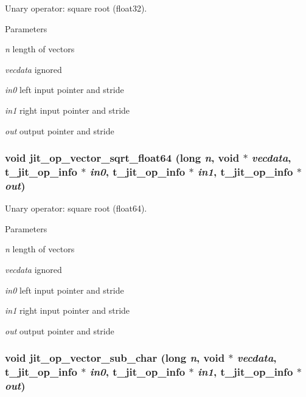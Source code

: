 Unary operator: square root (float32). 
\begin{DoxyParams}{Parameters}
\item[{\em n}]length of vectors \item[{\em vecdata}]ignored \item[{\em in0}]left input pointer and stride \item[{\em in1}]right input pointer and stride \item[{\em out}]output pointer and stride \end{DoxyParams}
\hypertarget{group__opvecmod_gae98261c46b7a3bb453df46f75d8aa75e}{
\subsubsection[{jit\_\-op\_\-vector\_\-sqrt\_\-float64}]{\setlength{\rightskip}{0pt plus 5cm}void jit\_\-op\_\-vector\_\-sqrt\_\-float64 (long {\em n}, \/  void $\ast$ {\em vecdata}, \/  {\bf t\_\-jit\_\-op\_\-info} $\ast$ {\em in0}, \/  {\bf t\_\-jit\_\-op\_\-info} $\ast$ {\em in1}, \/  {\bf t\_\-jit\_\-op\_\-info} $\ast$ {\em out})}}
\label{group__opvecmod_gae98261c46b7a3bb453df46f75d8aa75e}


Unary operator: square root (float64). 
\begin{DoxyParams}{Parameters}
\item[{\em n}]length of vectors \item[{\em vecdata}]ignored \item[{\em in0}]left input pointer and stride \item[{\em in1}]right input pointer and stride \item[{\em out}]output pointer and stride \end{DoxyParams}
\hypertarget{group__opvecmod_ga679a961f96238211a994318ac2ef9758}{
\subsubsection[{jit\_\-op\_\-vector\_\-sub\_\-char}]{\setlength{\rightskip}{0pt plus 5cm}void jit\_\-op\_\-vector\_\-sub\_\-char (long {\em n}, \/  void $\ast$ {\em vecdata}, \/  {\bf t\_\-jit\_\-op\_\-info} $\ast$ {\em in0}, \/  {\bf t\_\-jit\_\-op\_\-info} $\ast$ {\em in1}, \/  {\bf t\_\-jit\_\-op\_\-info} $\ast$ {\em out})}}
\label{group__opvecmod_ga679a961f96238211a994318ac2ef9758}


